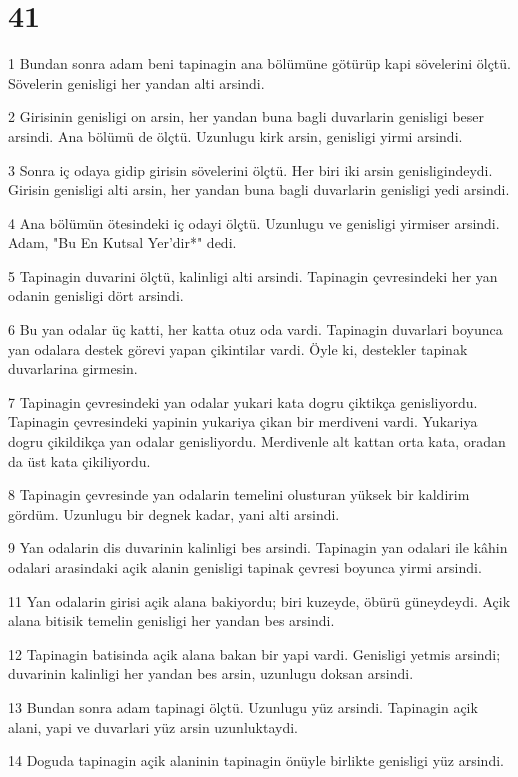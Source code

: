 \chapter{41}

\par 1 Bundan sonra adam beni tapinagin ana bölümüne götürüp kapi sövelerini ölçtü. Sövelerin genisligi her yandan alti arsindi.
\par 2 Girisinin genisligi on arsin, her yandan buna bagli duvarlarin genisligi beser arsindi. Ana bölümü de ölçtü. Uzunlugu kirk arsin, genisligi yirmi arsindi.
\par 3 Sonra iç odaya gidip girisin sövelerini ölçtü. Her biri iki arsin genisligindeydi. Girisin genisligi alti arsin, her yandan buna bagli duvarlarin genisligi yedi arsindi.
\par 4 Ana bölümün ötesindeki iç odayi ölçtü. Uzunlugu ve genisligi yirmiser arsindi. Adam, "Bu En Kutsal Yer'dir*" dedi.
\par 5 Tapinagin duvarini ölçtü, kalinligi alti arsindi. Tapinagin çevresindeki her yan odanin genisligi dört arsindi.
\par 6 Bu yan odalar üç katti, her katta otuz oda vardi. Tapinagin duvarlari boyunca yan odalara destek görevi yapan çikintilar vardi. Öyle ki, destekler tapinak duvarlarina girmesin.
\par 7 Tapinagin çevresindeki yan odalar yukari kata dogru çiktikça genisliyordu. Tapinagin çevresindeki yapinin yukariya çikan bir merdiveni vardi. Yukariya dogru çikildikça yan odalar genisliyordu. Merdivenle alt kattan orta kata, oradan da üst kata çikiliyordu.
\par 8 Tapinagin çevresinde yan odalarin temelini olusturan yüksek bir kaldirim gördüm. Uzunlugu bir degnek kadar, yani alti arsindi.
\par 9 Yan odalarin dis duvarinin kalinligi bes arsindi. Tapinagin yan odalari ile kâhin odalari arasindaki açik alanin genisligi tapinak çevresi boyunca yirmi arsindi.
\par 11 Yan odalarin girisi açik alana bakiyordu; biri kuzeyde, öbürü güneydeydi. Açik alana bitisik temelin genisligi her yandan bes arsindi.
\par 12 Tapinagin batisinda açik alana bakan bir yapi vardi. Genisligi yetmis arsindi; duvarinin kalinligi her yandan bes arsin, uzunlugu doksan arsindi.
\par 13 Bundan sonra adam tapinagi ölçtü. Uzunlugu yüz arsindi. Tapinagin açik alani, yapi ve duvarlari yüz arsin uzunluktaydi.
\par 14 Doguda tapinagin açik alaninin tapinagin önüyle birlikte genisligi yüz arsindi.
